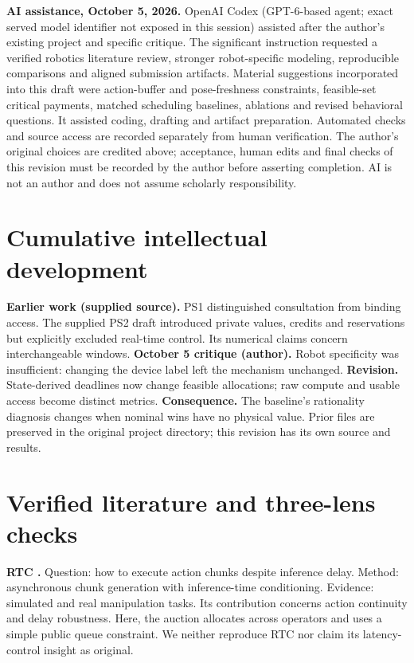 \textbf{AI assistance, October 5, 2026.} OpenAI Codex (GPT-6-based agent; exact served model identifier not exposed in this session) assisted after the author's existing project and specific critique. The significant instruction requested a verified robotics literature review, stronger robot-specific modeling, reproducible comparisons and aligned submission artifacts. Material suggestions incorporated into this draft were action-buffer and pose-freshness constraints, feasible-set critical payments, matched scheduling baselines, ablations and revised behavioral questions. It assisted coding, drafting and artifact preparation. Automated checks and source access are recorded separately from human verification. The author's original choices are credited above; acceptance, human edits and final checks of this revision must be recorded by the author before asserting completion. AI is not an author and does not assume scholarly responsibility.

\section{Cumulative intellectual development}
\textbf{Earlier work (supplied source).} PS1 distinguished consultation from binding access. The supplied PS2 draft introduced private values, credits and reservations but explicitly excluded real-time control. Its numerical claims concern interchangeable windows. \textbf{October 5 critique (author).} Robot specificity was insufficient: changing the device label left the mechanism unchanged. \textbf{Revision.} State-derived deadlines now change feasible allocations; raw compute and usable access become distinct metrics. \textbf{Consequence.} The baseline's rationality diagnosis changes when nominal wins have no physical value. Prior files are preserved in the original project directory; this revision has its own source and results.

\section{Verified literature and three-lens checks}
\textbf{RTC \cite{rtc}.} Question: how to execute action chunks despite inference delay. Method: asynchronous chunk generation with inference-time conditioning. Evidence: simulated and real manipulation tasks. Its contribution concerns action continuity and delay robustness. Here, the auction allocates across operators and uses a simple public queue constraint. We neither reproduce RTC nor claim its latency-control insight as original.

